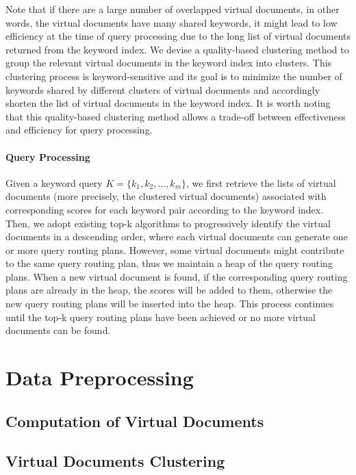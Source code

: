 Note that if there are a large number of overlapped virtual documents, in other words, the virtual
documents have many shared keywords, it might lead to low efficiency at the time of query processing
due to the long list of virtual documents returned from the keyword index. We devise a quality-based
clustering method to group the relevant virtual documents in the keyword index into clusters. This
clustering process is keyword-sensitive and its goal is to minimize the number of keywords shared by
different clusters of virtual documents and accordingly shorten the list of virtual documents in the
keyword index. It is worth noting that this quality-based clustering method allows a trade-off
between effectiveness and efficiency for query processing.

\paragraph{Query Processing}
Given a keyword query $K = \{k_1,k_2,\ldots,k_m\}$, we first retrieve the lists of virtual documents
(more precisely, the clustered virtual documents) associated with corresponding scores for each
keyword pair according to the keyword index. Then, we adopt existing top-k algorithms to
progressively identify the virtual documents in a descending order, where each virtual documents can
generate one or more query routing plans. However, some virtual documents might contribute to the
same query routing plan, thus we maintain a heap of the query routing plans. When a new virtual
document is found, if the corresponding query routing plans are already in the heap, the scores will
be added to them, otherwise the new query routing plans will be inserted into the heap. This process
continues until the top-k query routing plans have been achieved or no more virtual documents can be
found.

\section{Data Preprocessing}\label{qr:preprocessing}


\subsection{Computation of Virtual Documents}\label{qr:vdcompute}


\subsection{Virtual Documents Clustering}\label{qr:vdcluster}

